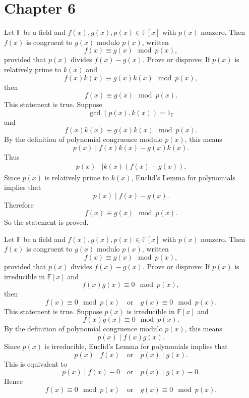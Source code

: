 
\section{Chapter 6}
\begin{problem}{
    Let $\mathbb{F}$ be a field and $f(x), g(x), p(x)\in\mathbb{F}[x]$ with $p(x)$ nonzero.
    Then $f(x)$ is congruent to $g(x)$ modulo $p(x)$, written
    \[
        f(x)\equiv g(x)\mod p(x),
    \]
    provided that $p(x)$ divides $f(x)-g(x)$.
    Prove or disprove:
    If $p(x)$ is relatively prime to $k(x)$ and
    \[
        f(x)k(x)\equiv g(x)k(x)\mod p(x),
    \]
    then
    \[
        f(x)\equiv g(x)\mod p(x).
    \]
}
    This statement is true.
    Suppose
    \[
        \gcd(p(x),k(x))=1_{\mathbb{F}}
    \]
    and
    \[
        f(x)k(x)\equiv g(x)k(x)\mod p(x).
    \]
    By the definition of polynomial congruence modulo $p(x)$, this means
    \[
        p(x)\mid f(x)k(x)-g(x)k(x).
    \]
    Thus
    \begin{align*}
        p(x) &\mid k(x)(f(x)-g(x)).
    \end{align*}
    Since $p(x)$ is relatively prime to $k(x)$, Euclid's Lemma for polynomials implies that
    \[
        p(x)\mid f(x)-g(x).
    \]
    Therefore
    \[
        f(x)\equiv g(x)\mod p(x).
    \]
    So the statement is proved.
\end{problem}
\begin{problem}{
    Let $\mathbb{F}$ be a field and $f(x), g(x), p(x)\in\mathbb{F}[x]$ with $p(x)$ nonzero.
    Then $f(x)$ is congruent to $g(x)$ modulo $p(x)$, written
    \[
        f(x)\equiv g(x)\mod p(x),
    \]
    provided that $p(x)$ divides $f(x)-g(x)$.
    Prove or disprove:
    If $p(x)$ is irreducible in $\mathbb{F}[x]$ and
    \[
        f(x)g(x)\equiv 0\mod p(x),
    \]
    then
    \[
        f(x)\equiv 0\mod p(x)
        \quad\text{or}\quad
        g(x)\equiv 0\mod p(x).
    \]
}
    This statement is true.
    Suppose $p(x)$ is irreducible in $\mathbb{F}[x]$ and
    \[
        f(x)g(x)\equiv 0\mod p(x).
    \]
    By the definition of polynomial congruence modulo $p(x)$, this means
    \[
        p(x)\mid f(x)g(x).
    \]
    Since $p(x)$ is irreducible, Euclid's Lemma for polynomials implies that
    \[
        p(x)\mid f(x)
        \quad\text{or}\quad
        p(x)\mid g(x).
    \]
    This is equivalent to
    \[
        p(x)\mid f(x)-0
        \quad\text{or}\quad
        p(x)\mid g(x)-0.
    \]
    Hence
    \[
        f(x)\equiv 0\mod p(x)
        \quad\text{or}\quad
        g(x)\equiv 0\mod p(x).
    \]
\end{problem}
